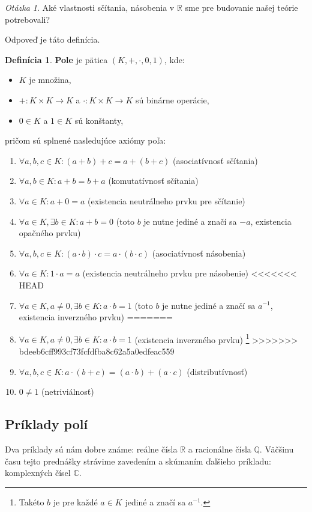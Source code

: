 \documentclass[11pt,a4paper]{article}
\theoremstyle{definition}
\newtheorem{definicia}{Definícia}[section]
\theoremstyle{plain}
\theoremstyle{remark}
\newtheorem*{question}{Otázka}
\newcommand{\R}{\mathbb{R}}
\begin{document}
\begin{question}
Aké vlastnosti sčítania, násobenia v $\R$ sme pre budovanie našej teórie potrebovali?
\end{question}
Odpoveď je táto definícia.

\begin{definicia}
\textbf{Pole} je pätica $(K, +, \cdot, 0, 1)$, kde:
\begin{itemize}
    \item $K$ je množina,
    \item $+: K \times K \to K$ a $\cdot: K \times K \to K$ sú binárne operácie,
    \item $0 \in K$ a $1 \in K$ sú konštanty,
\end{itemize}
pričom sú splnené nasledujúce axiómy poľa:
\begin{enumerate}
    \item $\forall a,b,c \in K: (a+b)+c = a+(b+c)$ (asociatívnosť sčítania)
    \item $\forall a,b \in K: a+b = b+a$ (komutatívnosť sčítania)
    \item $\forall a \in K: a+0 = a$ (existencia neutrálneho prvku pre sčítanie)
    \item $\forall a \in K, \exists b \in K: a+b=0$ (toto $b$ je nutne jediné a značí sa $-a$, existencia opačného prvku)
    \item $\forall a,b,c \in K: (a \cdot b) \cdot c = a \cdot (b \cdot c)$ (asociatívnosť násobenia)
    \item $\forall a \in K: 1 \cdot a = a$ (existencia neutrálneho prvku pre násobenie)
<<<<<<< HEAD
    \item $\forall a \in K, a \neq 0, \exists b \in K: a \cdot b = 1$ (toto $b$ je nutne jediné a značí sa $a^{-1}$, existencia inverzného prvku)
=======
    \item $\forall a \in K, a \neq 0, \exists b \in K: a \cdot b = 1$ (existencia inverzného prvku) \footnote{Takéto $b$
    je pre každé $a\in K$ jediné a značí sa $a^{-1}$.}
>>>>>>> bdeeb6cff993cf73fcfdfba8c62a5a0edfeac559
    \item $\forall a,b,c \in K: a \cdot (b+c) = (a \cdot b) + (a \cdot c)$ (distributívnosť)
    \item $0 \neq 1$ (netriviálnosť)
\end{enumerate}
\end{definicia}

\subsection*{Príklady polí}
Dva príklady sú nám dobre známe: reálne čísla $\R$ a racionálne čísla $\mathbb{Q}$. Väčšinu času tejto prednášky strávime zavedením a skúmaním ďalšieho príkladu: komplexných čísel $\mathbb{C}$.
\end{document}
